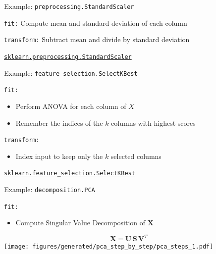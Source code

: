 \documentclass[presentation,mathserif,table]{beamer}
\newcommand{\X}{{\mathbold X}}
\newcommand{\bS}{{\mathbold S}}
\newcommand{\U}{{\mathbold U}}
\newcommand{\V}{{\mathbold V}}
\begin{document}
\begin{frame}[label={sec:org00073e9},fragile]{Example: \texttt{preprocessing.StandardScaler}}
 \begin{block}{\texttt{fit:}}
Compute mean and standard deviation of each column
\end{block}
\begin{block}{\texttt{transform:}}
Subtract mean and divide by standard deviation
\end{block}
\begin{structureenv} %
\href{https://scikit-learn.org/stable/modules/generated/sklearn.preprocessing.StandardScaler.html\#sklearn.preprocessing.StandardScaler}{\texttt{sklearn.preprocessing.StandardScaler}}
\end{structureenv}
\end{frame}
\begin{frame}[label={sec:org2acf587},fragile]{Example: \texttt{feature\_selection.SelectKBest}}
 \begin{block}{\texttt{fit:}}
\begin{itemize}
\item Perform ANOVA for each column of \(X\)
\item Remember the indices of the \(k\) columns with highest scores
\end{itemize}
\end{block}
\begin{block}{\texttt{transform:}}
\begin{itemize}
\item Index input to keep only the \(k\) selected columns
\end{itemize}
\end{block}


\begin{structureenv} %
\href{https://scikit-learn.org/stable/modules/generated/sklearn.feature\_selection.SelectKBest.html\#sklearn.feature\_selection.SelectKBest}{\texttt{sklearn.feature\_selection.SelectKBest}}
\end{structureenv}
\end{frame}

\begin{frame}[label={sec:org894bb01},fragile]{Example: \texttt{decomposition.PCA}}
 \begin{block}{\texttt{fit:}}
\begin{itemize}
\item Compute Singular Value Decomposition of \(\X\)
\end{itemize}
\begin{structureenv} %
\begin{equation}
\X = \U \, \bS \, \V^T
\end{equation}
\texttt{[image: figures/generated/pca\_step\_by\_step/pca\_steps\_1.pdf]}
\end{structureenv}
\end{block}
\end{frame}
\end{document}
